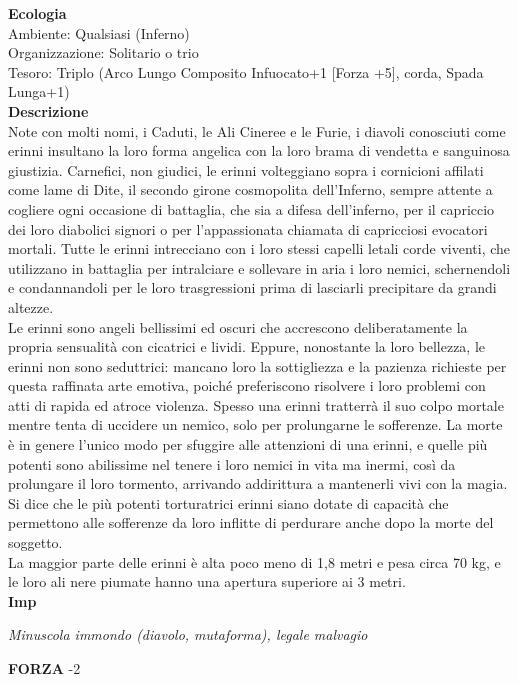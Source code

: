 \begin{multicols}{2}
\textbf{Ecologia}\\
Ambiente: Qualsiasi (Inferno)\\
Organizzazione: Solitario o trio\\
Tesoro: Triplo (Arco Lungo Composito Infuocato+1 [Forza +5], corda, Spada Lunga+1)\\
\textbf{Descrizione}\\
Note con molti nomi, i Caduti, le Ali Cineree e le Furie, i diavoli conosciuti come erinni insultano la loro forma angelica con la loro brama di vendetta e sanguinosa giustizia. Carnefici, non giudici, le erinni volteggiano sopra i cornicioni affilati come lame di Dite, il secondo girone cosmopolita dell'Inferno, sempre attente a cogliere ogni occasione di battaglia, che sia a difesa dell'inferno, per il capriccio dei loro diabolici signori o per l'appassionata chiamata di capricciosi evocatori mortali. Tutte le erinni intrecciano con i loro stessi capelli letali corde viventi, che utilizzano in battaglia per intralciare e sollevare in aria i loro nemici, schernendoli e condannandoli per le loro trasgressioni prima di lasciarli precipitare da grandi altezze.\\
Le erinni sono angeli bellissimi ed oscuri che accrescono deliberatamente la propria sensualità con cicatrici e lividi. Eppure, nonostante la loro bellezza, le erinni non sono seduttrici: mancano loro la sottigliezza e la pazienza richieste per questa raffinata arte emotiva, poiché preferiscono risolvere i loro problemi con atti di rapida ed atroce violenza. Spesso una erinni tratterrà il suo colpo mortale mentre tenta di uccidere un nemico, solo per prolungarne le sofferenze. La morte è in genere l'unico modo per sfuggire alle attenzioni di una erinni, e quelle più potenti sono abilissime nel tenere i loro nemici in vita ma inermi, così da prolungare il loro tormento, arrivando addirittura a mantenerli vivi con la magia. Si dice che le più potenti torturatrici erinni siano dotate di capacità che permettono alle sofferenze da loro inflitte di perdurare anche dopo la morte del soggetto.\\
La maggior parte delle erinni è alta poco meno di 1,8 metri e pesa circa 70 kg, e le loro ali nere piumate hanno una apertura superiore ai 3 metri.\\


\medskip{}\textbf{Imp}

\emph{Minuscola immondo (diavolo, mutaforma), legale malvagio}

\textbf{FORZA} -2


\end{multicols}
